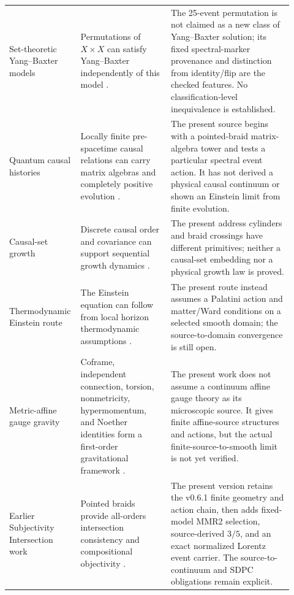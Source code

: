 \documentclass[11pt]{article}
\theoremstyle{definition}
\theoremstyle{remark}
\begin{document}
{\begin{longtable}{>{\raggedright\arraybackslash}p{0.19\linewidth}>{\raggedright\arraybackslash}p{0.31\linewidth}>{\raggedright\arraybackslash}p{0.42\linewidth}}
Set-theoretic Yang--Baxter models & Permutations of $X\times X$ can satisfy Yang--Baxter independently of this model \cite{etingof1998}. & The 25-event permutation is not claimed as a new class of Yang--Baxter solution; its fixed spectral-marker provenance and distinction from identity/flip are the checked features. No classification-level inequivalence is established. \\
Quantum causal histories & Locally finite pre-spacetime causal relations can carry matrix algebras and completely positive evolution \cite{hawkins2003}. & The present source begins with a pointed-braid matrix-algebra tower and tests a particular spectral event action. It has not derived a physical causal continuum or shown an Einstein limit from finite evolution. \\
Causal-set growth & Discrete causal order and covariance can support sequential growth dynamics \cite{rideout1999}. & The present address cylinders and braid crossings have different primitives; neither a causal-set embedding nor a physical growth law is proved. \\
Thermodynamic Einstein route & The Einstein equation can follow from local horizon thermodynamic assumptions \cite{jacobson1995}. & The present route instead assumes a Palatini action and matter/Ward conditions on a selected smooth domain; the source-to-domain convergence is still open. \\
Metric-affine gauge gravity & Coframe, independent connection, torsion, nonmetricity, hypermomentum, and Noether identities form a first-order gravitational framework \cite{hehl1995}. & The present work does not assume a continuum affine gauge theory as its microscopic source. It gives finite affine-source structures and actions, but the actual finite-source-to-smooth limit is not yet verified. \\
Earlier Subjectivity Intersection work & Pointed braids provide all-orders intersection consistency and compositional objectivity \cite{watanabe2026braid}. & The present version retains the v0.6.1 finite geometry and action chain, then adds fixed-model MMR2 selection, source-derived $3/5$, and an exact normalized Lorentz event carrier. The source-to-continuum and SDPC obligations remain explicit. \\
\bottomrule
\end{longtable}
}
\end{document}
